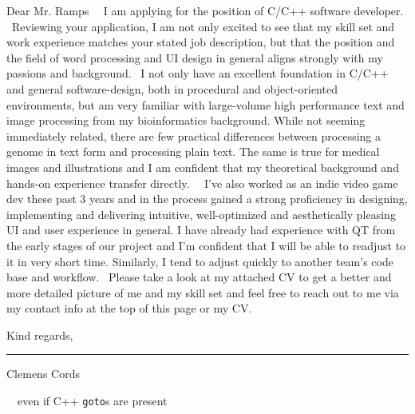 \documentclass[11pt]{article}
\newcommand{\muted}{\color{muted_grey}}
\newcommand{\emptyline}{\,\newline}
\begin{document}
\begin{flushleft}
Dear Mr. Ramps
\emptyline
\emptyline
I am applying for the position of C/C++ software developer.\linebreak
\emptyline
Reviewing your application, I am not only excited to see that my skill set and work experience
matches your stated job description, but that the position and the field of word processing and
UI design in general aligns strongly with my passions and background.\linebreak
\emptyline
I not only have an excellent foundation in C/C++ and general software-design, both in
procedural and object-oriented environments, but am very familiar with large-volume high
performance text and image processing from my bioinformatics background.
While not seeming immediately related, there are few practical differences between processing a genome
in text form and processing plain text.
The same is true for medical images and illustrations and I am confident that my theoretical background and hands-on experience transfer directly.
\emptyline
\emptyline
I've also worked as an indie video game dev these past 3 years and in the process gained a strong proficiency in designing, implementing and delivering intuitive, well-optimized and aesthetically
pleasing UI and user experience in general.
I have already had experience with QT from the early stages of our project and I'm confident that I will be able to readjust to it in very short time.
Similarly, I tend to adjust quickly to another team's code base {\muted\textasteriskcentered} and workflow.\linebreak
\emptyline
Please take a look at my attached CV to get a better and more detailed picture of me and my skill set and feel free to reach out to me via my contact info at the top of this page or my CV.\linebreak
\emptyline

Kind regards,\newline
\emptyline
\emptyline
\emptyline
\emptyline

\rule[0pt]{30ex}{0.5pt}\newline
{\muted Clemens Cords}
\end{flushleft}

\begin{flushright}
\emptyline
\emptyline
{\small\color{light_grey}\textasteriskcentered \:even if C++ \lstinline{goto}s are present}
\end{flushright}
\end{document}

